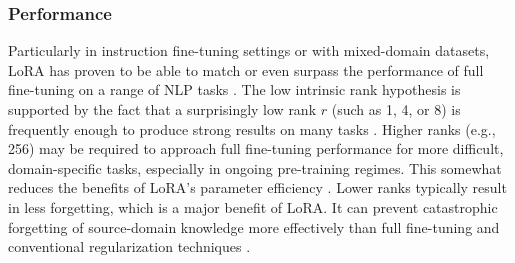 \documentclass{DESSThesis}
\begin{document}
\subsubsection{Performance}
Particularly in instruction fine-tuning settings or with mixed-domain datasets, LoRA has proven to be able to match or even surpass the performance of full fine-tuning on a range of NLP tasks \cite{hu_lora_2021,zhao_lora_2024,biderman_lora_2024}. The low intrinsic rank hypothesis is supported by the fact that a surprisingly low rank $r$ (such as 1, 4, or 8) is frequently enough to produce strong results on many tasks \cite{hu_lora_2021}. Higher ranks (e.g., 256) may be required to approach full fine-tuning performance for more difficult, domain-specific tasks, especially in ongoing pre-training regimes. This somewhat reduces the benefits of LoRA's parameter efficiency \cite{biderman_lora_2024,zhao_lora_2024}. Lower ranks typically result in less forgetting, which is a major benefit of LoRA. It can prevent catastrophic forgetting of source-domain knowledge more effectively than full fine-tuning and conventional regularization techniques \cite{biderman_lora_2024}.
\end{document}
